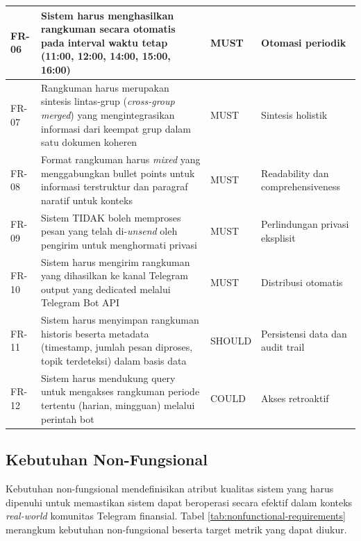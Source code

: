 \begin{longtable}{|p{1.5cm}|p{8cm}|p{2cm}|p{3cm}|}
FR-06 & Sistem harus menghasilkan rangkuman secara otomatis pada interval waktu tetap (11:00, 12:00, 14:00, 15:00, 16:00) & MUST & Otomasi periodik \\
\hline

FR-07 & Rangkuman harus merupakan sintesis lintas-grup (\textit{cross-group merged}) yang mengintegrasikan informasi dari keempat grup dalam satu dokumen koheren & MUST & Sintesis holistik \\
\hline

FR-08 & Format rangkuman harus \textit{mixed} yang menggabungkan bullet points untuk informasi terstruktur dan paragraf naratif untuk konteks & MUST & Readability dan comprehensiveness \\
\hline

FR-09 & Sistem TIDAK boleh memproses pesan yang telah di-\textit{unsend} oleh pengirim untuk menghormati privasi & MUST & Perlindungan privasi eksplisit \\
\hline

FR-10 & Sistem harus mengirim rangkuman yang dihasilkan ke kanal Telegram output yang dedicated melalui Telegram Bot API & MUST & Distribusi otomatis \\
\hline

FR-11 & Sistem harus menyimpan rangkuman historis beserta metadata (timestamp, jumlah pesan diproses, topik terdeteksi) dalam basis data & SHOULD & Persistensi data dan audit trail \\
\hline

FR-12 & Sistem harus mendukung query untuk mengakses rangkuman periode tertentu (harian, mingguan) melalui perintah bot & COULD & Akses retroaktif \\
\hline
\end{longtable}

\subsection{Kebutuhan Non-Fungsional}

Kebutuhan non-fungsional mendefinisikan atribut kualitas sistem yang harus dipenuhi untuk memastikan sistem dapat beroperasi secara efektif dalam konteks \textit{real-world} komunitas Telegram finansial. Tabel \ref{tab:nonfunctional-requirements} merangkum kebutuhan non-fungsional beserta target metrik yang dapat diukur.

